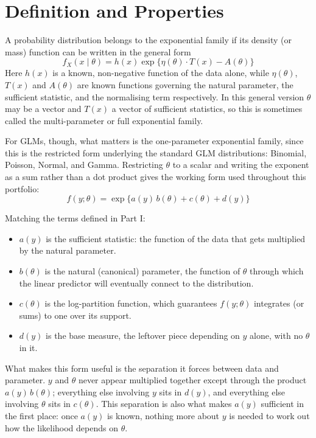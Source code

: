 \documentclass[12pt,a4paper]{report}
\begin{document}
\section{Definition and Properties}

A probability distribution belongs to the exponential family if its density (or mass) function can be written in the general form
\[
f_X(x \mid \theta) = h(x)\exp\big\{\eta(\theta)\cdot T(x) - A(\theta)\big\}
\]
Here $h(x)$ is a known, non-negative function of the data alone, while $\eta(\theta)$, $T(x)$ and $A(\theta)$ are known functions governing the natural parameter, the sufficient statistic, and the normalising term respectively. In this general version $\theta$ may be a vector and $T(x)$ a vector of sufficient statistics, so this is sometimes called the multi-parameter or full exponential family.

For GLMs, though, what matters is the one-parameter exponential family, since this is the restricted form underlying the standard GLM distributions: Binomial, Poisson, Normal, and Gamma. Restricting $\theta$ to a scalar and writing the exponent as a sum rather than a dot product gives the working form used throughout this portfolio:
\[
f(y;\theta) = \exp\big\{a(y)\,b(\theta) + c(\theta) + d(y)\big\}
\]

Matching the terms defined in Part I:
\begin{itemize}
  \item $a(y)$ is the sufficient statistic: the function of the data that gets multiplied by the natural parameter.
  \item $b(\theta)$ is the natural (canonical) parameter, the function of $\theta$ through which the linear predictor will eventually connect to the distribution.
  \item $c(\theta)$ is the log-partition function, which guarantees $f(y;\theta)$ integrates (or sums) to one over its support.
  \item $d(y)$ is the base measure, the leftover piece depending on $y$ alone, with no $\theta$ in it.
\end{itemize}

What makes this form useful is the separation it forces between data and parameter. $y$ and $\theta$ never appear multiplied together except through the product $a(y)\,b(\theta)$; everything else involving $y$ sits in $d(y)$, and everything else involving $\theta$ sits in $c(\theta)$. This separation is also what makes $a(y)$ sufficient in the first place: once $a(y)$ is known, nothing more about $y$ is needed to work out how the likelihood depends on $\theta$.
\end{document}
